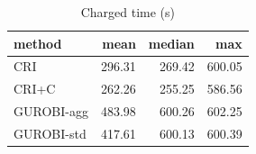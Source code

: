 \begin{table}[htbp]
\centering
\small
\caption{Charged time (s)}
\label{tab:E3_long_runs_b600_time}
\begin{tabular}{lrrr}
\toprule
method & mean & median & max \\
\midrule
CRI & 296.31 & 269.42 & 600.05 \\
CRI+C & 262.26 & 255.25 & 586.56 \\
GUROBI-agg & 483.98 & 600.26 & 602.25 \\
GUROBI-std & 417.61 & 600.13 & 600.39 \\
\bottomrule
\end{tabular}
\end{table}

